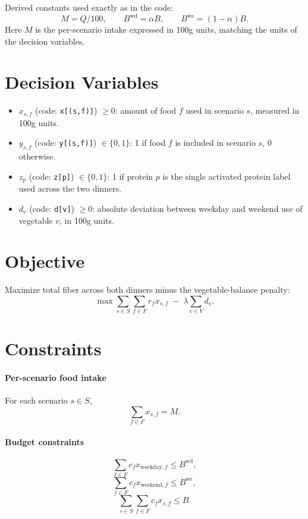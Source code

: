 Derived constants used exactly as in the code:
\[
M = Q/100, \qquad B^{\text{wd}}=\alpha B, \qquad B^{\text{we}}=(1-\alpha)B.
\]
Here \(M\) is the per-scenario intake expressed in 100g units, matching the units of the decision variables.

\section*{Decision Variables}

\begin{itemize}
    \item \(x_{s,f}\) (code: \texttt{x[(s,f)]}) \(\ge 0\): amount of food \(f\) used in scenario \(s\), measured in 100g units.
    \item \(y_{s,f}\) (code: \texttt{y[(s,f)]}) \(\in \{0,1\}\): 1 if food \(f\) is included in scenario \(s\), 0 otherwise.
    \item \(z_p\) (code: \texttt{z[p]}) \(\in \{0,1\}\): 1 if protein \(p\) is the single activated protein label used across the two dinners.
    \item \(d_v\) (code: \texttt{d[v]}) \(\ge 0\): absolute deviation between weekday and weekend use of vegetable \(v\), in 100g units.
\end{itemize}

\section*{Objective}

Maximize total fiber across both dinners minus the vegetable-balance penalty:
\[
\max \sum_{s \in S}\sum_{f \in F} r_f x_{s,f}
\;-\;
\lambda \sum_{v \in V} d_v.
\]

\section*{Constraints}

\paragraph{Per-scenario food intake}
For each scenario \(s \in S\),
\[
\sum_{f \in F} x_{s,f} = M.
\]

\paragraph{Budget constraints}
\[
\sum_{f \in F} c_f x_{\text{weekday},f} \le B^{\text{wd}},
\]
\[
\sum_{f \in F} c_f x_{\text{weekend},f} \le B^{\text{we}},
\]
\[
\sum_{s \in S}\sum_{f \in F} c_f x_{s,f} \le B.
\]


